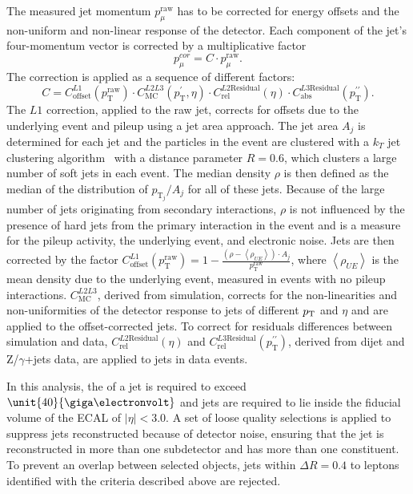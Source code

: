 The measured jet momentum $p_{\mu}^{\text{raw}}$ has to be corrected for energy offsets and the non-uniform and non-linear response of the detector. Each component of the jet's four-momentum vector is corrected by a multiplicative factor~\cite{1748-0221-6-11-P11002}
\begin{equation}
p_{\mu}^{cor} = C \cdot p_{\mu}^{\text{raw}}.
\end{equation} 
The correction is applied as a sequence of different factors: 
\begin{equation}
C = C^{L1}_{\text{offset}}(p_{\mathrm{T}}^{\text{raw}})\cdot C^{L2L3}_{\text{MC}}(p_{\mathrm{T}}^{\prime},\eta)\cdot C^{L2\text{Residual}}_{\text{rel}}(\eta) \cdot C^{L3\text{Residual}}_{\text{abs}}(p_{\mathrm{T}}^{\prime\prime}).
\end{equation}
The $L1$ correction, applied to the raw jet, corrects for offsets due to the underlying event and pileup using a jet area approach. The jet area $A_j$ is determined for each jet and the particles in the event are clustered with a $k_T$ jet clustering algorithm~\cite{Catani:1991hj} with a distance parameter $R=0.6$, which clusters a large number of soft jets in each event. The median \pt density $\rho$ is then defined as the median of the distribution of $p_{\mathrm{T}_j}/A_j$ for all of these jets. Because of the large number of jets originating from secondary interactions, $\rho$ is not influenced by the presence of hard jets from the primary interaction in the event and is a measure for the pileup activity, the underlying event, and electronic noise. Jets are then corrected by the factor $C^{L1}_{\text{offset}}(p_\mathrm{T}^{\text{raw}}) = 1-\frac{(\rho-\left<\rho_{UE}\right>)\cdot A_j}{p_\mathrm{T}^{\text{raw}}}$, where $\left<\rho_{UE}\right>$ is the mean \pt density due to the underlying event, measured in events with no pileup interactions. $C^{L2L3}_{\text{MC}}$, derived from simulation, corrects for the non-linearities and non-uniformities of the detector response to jets of different $p_{\mathrm{T}}$ and $\eta$ and are applied to the offset-corrected jets. To correct for residuals differences between simulation and data, $C^{L2\text{Residual}}_{\text{rel}}(\eta)$ and $C^{L3\text{Residual}}_{\text{rel}}(p_{\mathrm{T}}^{\prime\prime})$, derived from dijet and Z/$\gamma$+jets data, are applied to jets in data events. 

In this analysis, the \pt of a jet is required to exceed $\unit{40}{\giga\electronvolt}$ and jets are required to lie inside the fiducial volume of the ECAL of $|\eta| < 3.0$. A set of loose quality selections is applied to suppress jets reconstructed because of detector noise, ensuring that the jet is reconstructed in more than one subdetector and has more than one constituent. To prevent an overlap between selected objects, jets within $\Delta R = 0.4$ to leptons identified with the criteria described above are rejected. 

